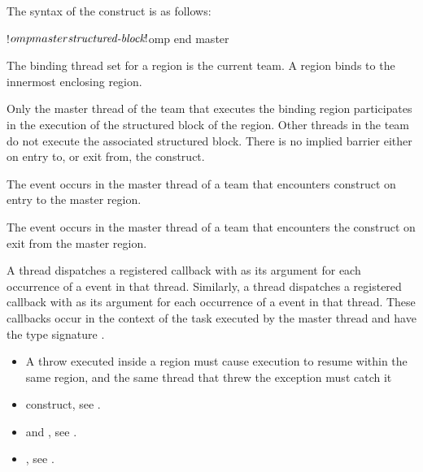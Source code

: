 \begin{fortranspecific}
The syntax of the  construct is as follows:

\begin{ompfPragma}
!$omp master
   \plc{structured-block}
!$omp end master
\end{ompfPragma}
\end{fortranspecific}

\binding
The binding thread set for a  region is the current team. 
A  region binds to the innermost enclosing  region. 

\descr
Only the master thread of the team that executes the binding  region
participates in the execution of the structured block of the  region.
Other threads in the team do not execute the associated structured block. There is no
implied barrier either on entry to, or exit from, the  construct.

\events

The  event occurs in the master thread of a team that 
encounters  construct on entry to the master region.

The  event occurs in the master thread of a team that 
encounters the  construct on exit from the master region.

\tools

A thread dispatches a registered  callback 
with  as its  argument for each 
occurrence of a  event in that thread. Similarly, a
thread dispatches a registered  callback 
with  as its  argument for each 
occurrence of a  event in that thread. These callbacks 
occur in the context of the task executed by the master thread and have
the type signature . 

\restrictions
\begin{cppspecific}
\begin{itemize}
\item A throw executed inside a  region must cause execution 
      to resume within the same  region, and the same thread 
      that threw the exception must catch it
\end{itemize}
\end{cppspecific}

\crossreferences
\begin{itemize}
\item {} construct, see .

\item {} and , see
.

\item {}, see
.


\end{itemize}

